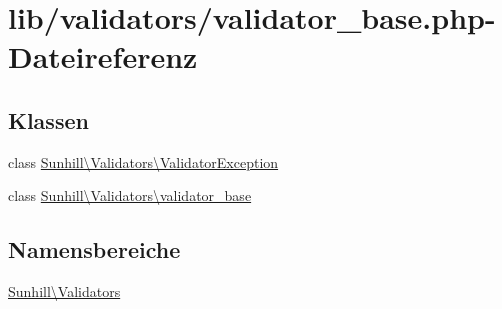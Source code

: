 \hypertarget{validator__base_8php}{}\section{lib/validators/validator\+\_\+base.php-\/\+Dateireferenz}
\label{validator__base_8php}
\subsection*{Klassen}
\begin{DoxyCompactItemize}
\item 
class \hyperlink{classSunhill_1_1Validators_1_1ValidatorException}{Sunhill\textbackslash{}\+Validators\textbackslash{}\+Validator\+Exception}
\item 
class \hyperlink{classSunhill_1_1Validators_1_1validator__base}{Sunhill\textbackslash{}\+Validators\textbackslash{}validator\+\_\+base}
\end{DoxyCompactItemize}
\subsection*{Namensbereiche}
\begin{DoxyCompactItemize}
\item 
 \hyperlink{namespaceSunhill_1_1Validators}{Sunhill\textbackslash{}\+Validators}
\end{DoxyCompactItemize}
